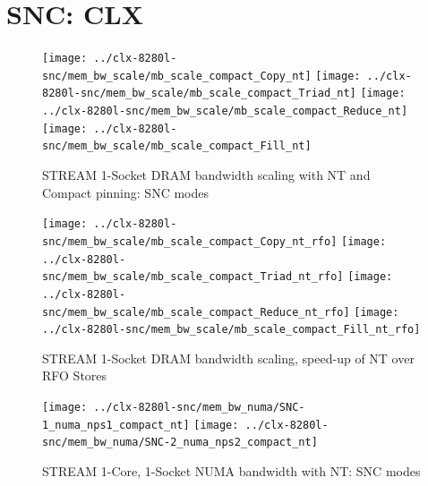 \documentclass{article}
\begin{document}
\section{SNC: CLX}
\begin{figure}[!ht]
    \centering
    \texttt{[image: ../clx-8280l-snc/mem\_bw\_scale/mb\_scale\_compact\_Copy\_nt]}
    \texttt{[image: ../clx-8280l-snc/mem\_bw\_scale/mb\_scale\_compact\_Triad\_nt]}
    \texttt{[image: ../clx-8280l-snc/mem\_bw\_scale/mb\_scale\_compact\_Reduce\_nt]}
    \texttt{[image: ../clx-8280l-snc/mem\_bw\_scale/mb\_scale\_compact\_Fill\_nt]}
    \caption{STREAM 1-Socket DRAM bandwidth scaling with NT and Compact pinning: SNC modes}
    \label{figure:mem_bw_scale_compact_NT_clx_snc}
\end{figure}
\begin{figure}[!ht]
    \centering
    \texttt{[image: ../clx-8280l-snc/mem\_bw\_scale/mb\_scale\_compact\_Copy\_nt\_rfo]}
    \texttt{[image: ../clx-8280l-snc/mem\_bw\_scale/mb\_scale\_compact\_Triad\_nt\_rfo]}
    \texttt{[image: ../clx-8280l-snc/mem\_bw\_scale/mb\_scale\_compact\_Reduce\_nt\_rfo]}
    \texttt{[image: ../clx-8280l-snc/mem\_bw\_scale/mb\_scale\_compact\_Fill\_nt\_rfo]}
    \caption{STREAM 1-Socket DRAM bandwidth scaling, speed-up of NT over RFO Stores}
    \label{figure:mem_bw_scale_compact_nt_rfo_clx_snc}
\end{figure}

\begin{figure}[!ht]
    \centering
    \texttt{[image: ../clx-8280l-snc/mem\_bw\_numa/SNC-1\_numa\_nps1\_compact\_nt]}
    \texttt{[image: ../clx-8280l-snc/mem\_bw\_numa/SNC-2\_numa\_nps2\_compact\_nt]}
    \caption{STREAM 1-Core, 1-Socket NUMA bandwidth with NT: SNC modes}
    \label{figure:mem_bw_numa_nt_clx_snc}
\end{figure}
\end{document}

